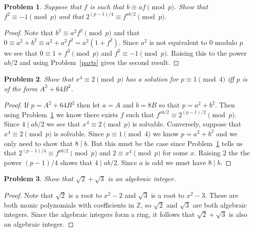 \documentclass{article}
\newtheorem{problem}{Problem}
\begin{document}
\begin{problem}
\label{f}
Suppose that $f$ is such that $b \equiv af \pmod{p}$. Show that $f^2 \equiv -1 \pmod{p}$ and that $2^{(p-1)/4} \equiv f^{ab/2} \pmod{p}$.
\end{problem}
\begin{proof}
Note that $b^2 \equiv a^2f^2 \pmod{p}$ and that $0 \equiv a^2 + b^2 \equiv a^2 + a^2f^2 = a^2(1 + f^2)$. Since $a^2$ is not equivalent to $0$ modulo $p$ we see that $0 \equiv 1 + f^2 \pmod{p}$ and $f^2 \equiv -1 \pmod{p}$. Raising this to the power $ab/2$ and using Problem~\ref{parts} gives the second result.
\end{proof}

\begin{problem}
Show that $x^4 \equiv 2 \pmod{p}$ has a solution for $p \equiv 1 \pmod{4}$ iff $p$ is of the form $A^2 + 64B^2$.
\end{problem}
\begin{proof}
If $p = A^2 + 64B^2$ then let $a = A$ and $b = 8B$ so that $p = a^2 + b^2$. Then using Problem~\ref{f} we know there exists $f$ such that $f^{ab/2} \equiv 2^{(p-1)/2} \pmod{p}$. Since $4 \mid ab/2$ we see that $x^4 \equiv 2 \pmod{p}$ is solvable. Conversely, suppose that $x^4 \equiv 2 \pmod{p}$ is solvable. Since $p \equiv 1 \pmod{4}$ we know $p = a^2 + b^2$ and we only need to show that $8 \mid b$. But this must be the case since Problem~\ref{f} tells us that $2^{(p-1)/4} \equiv f^{ab/2} \pmod{p}$ and $2 \equiv x^4 \pmod{p}$ for some $x$. Raising $2$ the the power $(p-1)/4$ shows that $4 \mid ab/2$. Since $a$ is odd we must have $8 \mid b$.
\end{proof}

\begin{problem}
Show that $\sqrt{2} + \sqrt{3}$ is an algebraic integer.
\end{problem}
\begin{proof}
Note that $\sqrt{2}$ is a root to $x^2 - 2$ and $\sqrt{3}$ is a root to $x^2 - 3$. These are both monic polynomials with coefficients in $\mathbb{Z}$, so $\sqrt{2}$ and $\sqrt{3}$ are both algebraic integers. Since the algebraic integers form a ring, it follows that $\sqrt{2} + \sqrt{3}$ is also an algebraic integer.
\end{proof}
\end{document}
